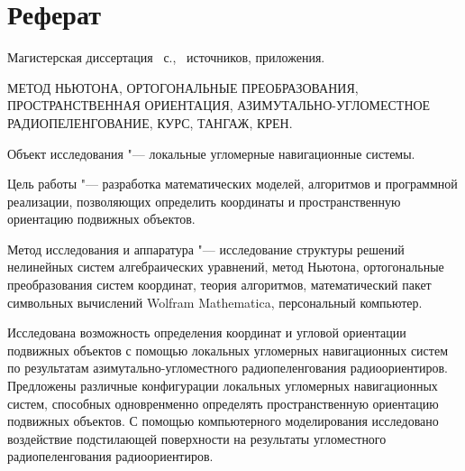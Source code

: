 \documentclass[../main.tex]{subfiles}
\begin{document}
\newpage
\section*{\centering Реферат}

\par\noindent Магистерская диссертация ~с., \ источников,  приложения.\\
\vspace{0.5cm}

\par\noindent  МЕТОД НЬЮТОНА, ОРТОГОНАЛЬНЫЕ ПРЕОБРАЗОВАНИЯ, ПРОСТРАНСТВЕННАЯ ОРИЕНТАЦИЯ, АЗИМУТАЛЬНО-УГЛОМЕСТНОЕ РАДИОПЕЛЕНГОВАНИЕ, КУРС, ТАНГАЖ, КРЕН. \\

\par\noindent Объект исследования "--- локальные угломерные навигационные системы.\\
\par\noindent Цель работы "--- разработка математических моделей, алгоритмов и программной реализации, позволяющих определить координаты и пространственную ориентацию подвижных объектов.\\
\par\noindent Метод исследования и аппаратура "--- исследование структуры решений нелинейных систем алгебраических уравнений, метод Ньютона, ортогональные преобразования систем координат, теория алгоритмов, математический пакет символьных вычислений {\ttfamily Wolfram Mathematica}, персональный компьютер.\\

\par\noindent Исследована возможность определения координат и угловой ориентации подвижных объектов с помощью локальных угломерных навигационных систем по результатам азимутально-угломестного радиопеленгования радиоориентиров. Предложены различные конфигурации локальных угломерных навигационных систем, способных одновренменно определять пространственную ориентацию подвижных объектов. С помощью компьютерного моделирования исследовано воздействие подстилающей поверхности на результаты угломестного радиопеленгования радиоориентиров.

\clearpage
\normalsize
\end{document}
